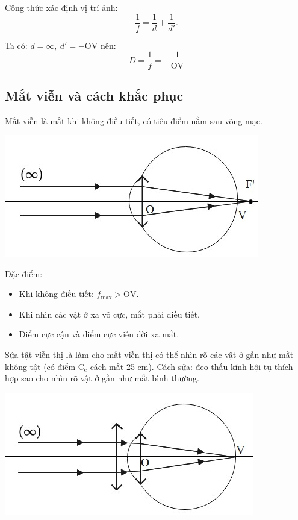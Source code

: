Công thức xác định vị trí ảnh: $$\dfrac{1}{f}=\dfrac{1}{d}+\dfrac{1}{d'}.$$

Ta có: $d=\infty, \ d'=-\text{OV}$ nên:
\begin{equation}
 D=\dfrac{1}{f}=-\dfrac{1}{\text{OV}}
\end{equation}


\subsection{Mắt viễn và cách khắc phục}
Mắt viễn là mắt khi không điều tiết, có tiêu điểm nằm sau võng mạc.
	\begin{center}
		\includegraphics[scale=0.8]{../figs/VN11-PH-40-L-028-3-h39.jpg}
	\end{center}

 Đặc điểm:
	\begin{itemize}
		\item Khi không điều tiết: $f_\text{max}> \text{OV}$.
		\item Khi nhìn các vật ở xa vô cực, mắt phải điều tiết.
		\item Điểm cực cận và điểm cực viễn dời xa mắt.
	\end{itemize}
	
Sửa tật viễn thị là làm cho mắt viễn thị có thể nhìn rõ các vật ở gần như mắt không tật (có điểm $\text{C}_\text{c}$ cách mắt 25 cm). Cách sửa: đeo thấu kính hội tụ thích hợp sao cho nhìn rõ vật ở gần như mắt bình thường. 
	\begin{center}
		\includegraphics[scale=0.8]{../figs/VN11-PH-40-L-028-3-h40.jpg}
	\end{center}


